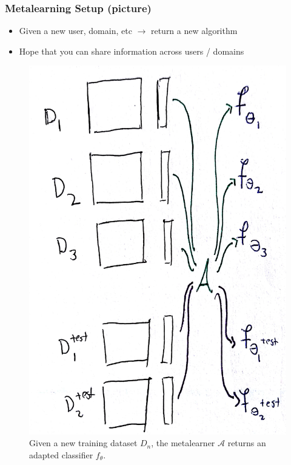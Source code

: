 \documentclass[10pt,mathserif]{beamer}
\begin{document}
\begin{frame}
  \frametitle{Metalearning Setup (picture)}
  \begin{itemize}
  \item Given a new user, domain, etc $\rightarrow$ return a new algorithm
  \item Hope that you can share information across users / domains
  \end{itemize}
  \begin{figure}[ht]
    \centering
    \includegraphics[width=0.3\paperwidth]{figure/metalearning_setup_boxes}
    \caption{Given a new training dataset $D_n$, the metalearner $\mathcal{A}$
      returns an adapted classifier
      $f_{\theta}$. \label{fig:metalearning_setup_boxes}}
  \end{figure}
\end{frame}
\end{document}

